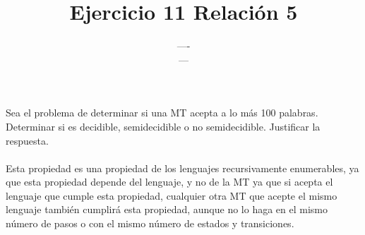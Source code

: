 \documentclass{article}
\title{Ejercicio 11 Relación 5}
\author{---- \\ ---}
\date{}
\begin{document}
\maketitle

Sea el problema de determinar si una MT acepta a lo más 100 palabras. Determinar si es decidible, semidecidible o no semidecidible. Justificar la respuesta.
\\
\\

Esta propiedad es una propiedad de los lenguajes recursivamente enumerables, ya que esta propiedad depende del lenguaje, y no de la MT ya que si acepta el lenguaje que cumple esta propiedad, cualquier otra MT que acepte el mismo lenguaje también cumplirá esta propiedad, aunque no lo haga en el mismo número de pasos o con el mismo número de estados y transiciones.
\end{document}
